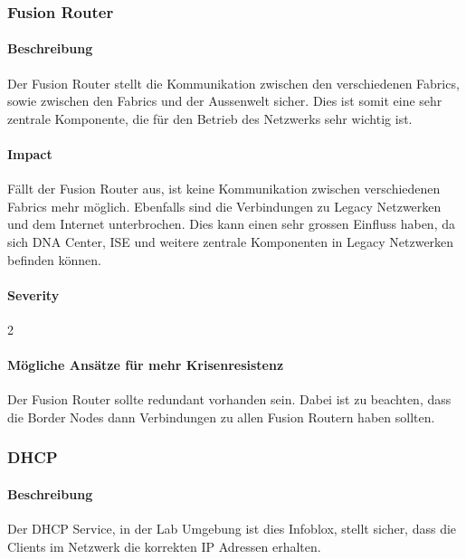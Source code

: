 \subsubsection{Fusion Router}

\paragraph{Beschreibung}

Der Fusion Router stellt die Kommunikation zwischen den verschiedenen Fabrics, sowie zwischen den Fabrics und der Aussenwelt sicher. Dies ist somit eine sehr zentrale Komponente, die für den Betrieb des Netzwerks sehr wichtig ist.

\paragraph{Impact}

Fällt der Fusion Router aus, ist keine Kommunikation zwischen verschiedenen Fabrics mehr möglich. Ebenfalls sind die Verbindungen zu Legacy Netzwerken und dem Internet unterbrochen. Dies kann einen sehr grossen Einfluss haben, da sich DNA Center, ISE und weitere zentrale Komponenten in Legacy Netzwerken befinden können.

\paragraph{Severity} 2

\paragraph{Mögliche Ansätze für mehr Krisenresistenz}

Der Fusion Router sollte redundant vorhanden sein. Dabei ist zu beachten, dass die Border Nodes dann Verbindungen zu allen Fusion Routern haben sollten.

\subsubsection{DHCP}

\paragraph{Beschreibung}

Der DHCP Service, in der Lab Umgebung ist dies Infoblox, stellt sicher, dass die Clients im Netzwerk die korrekten IP Adressen erhalten.

